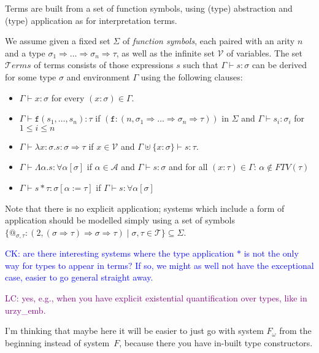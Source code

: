 \documentclass[runningheads,a4paper]{llncs}
\newcommand{\Typevars}{\mathcal{A}}
\newcommand{\Vars}{\mathcal{V}}
\newcommand{\Types}{\mathcal{T}}
\newcommand{\Terms}{\mathcal{T}\!\mathit{erms}}
\newcommand{\quant}[2]{\forall #1[#2]}
\newcommand{\arrtype}{\Rightarrow}
\newcommand{\abs}[2]{\lambda #1.#2}
\newcommand{\tabs}[2]{\Lambda #1.#2}
\newcommand{\tapp}[2]{#1 * #2}
\newcommand{\subst}[2]{#1:=#2}
\newcommand{\FTV}{\mathit{FTV}}
\newcommand{\CK}[1]{\textcolor{blue}{CK: #1}}
\newcommand{\LC}[1]{\textcolor{purple}{LC: #1}}
\begin{document}
Terms are built from a set of function symbols, using (type) abstraction
and (type) application as for interpretation terms.

\begin{definition}
We assume given a fixed set $\Sigma$ of \emph{function symbols}, each
paired with an arity $n$ and a type $\sigma_1 \arrtype \dots \arrtype
\sigma_n \arrtype \tau$, as well as the infinite set $\Vars$ of variables.
The set $\Terms$ of terms consists of those expressions $s$ such that
$\Gamma \vdash s : \sigma$ can be derived for some type $\sigma$ and
environment $\Gamma$ using the following clauses:
\begin{itemize}
\item $\Gamma \vdash x : \sigma$ for every $(x : \sigma) \in \Gamma$.
\item $\Gamma \vdash \mathtt{f}(s_1,\dots,s_n) : \tau$ if
  $(\mathtt{f} : (n,\sigma_1 \arrtype \dots \arrtype \sigma_n \arrtype
  \tau))$ in $\Sigma$ and $\Gamma \vdash s_i : \sigma_i$ for $1 \leq
  i \leq n$
\item $\Gamma \vdash \abs{x:\sigma}{s} : \sigma \arrtype \tau$ if $x
  \in \Vars$ and $\Gamma \uplus \{ x : \sigma \} \vdash s : \tau$.
\item $\Gamma \vdash \tabs{\alpha}{s} : \quant{\alpha}{\sigma}$ if
  $\alpha \in \Typevars$ and $\Gamma \vdash s : \sigma$ and for all
  $(x : \tau) \in \Gamma$: $\alpha \notin \FTV(\tau)$
\item $\Gamma \vdash \tapp{s}{\tau} : \sigma[\subst{\alpha}{\tau}]$ if
  $\Gamma \vdash s : \quant{\alpha}{\sigma}$
\end{itemize}
\end{definition}

Note that there is no explicit application; systems which include a form
of application should be modelled simply using a set of symbols $\{
@_{\sigma,\tau}: (2,(\sigma \arrtype \tau) \arrtype \sigma \arrtype \tau)
\mid \sigma,\tau \in \Types \} \subseteq \Sigma$.

\CK{are there interesting systems where the type application $*$ is
not the only way for types to appear in terms?  If so, we might as well
not have the exceptional case, easier to go general straight away.}

\LC{yes, e.g., when you have explicit existential quantification over
types, like in urzy\_emb.}

I'm thinking that maybe here it will be easier to just go with
system $F_\omega$ from the beginning instead of system~$F$, because
there you have in-built type constructors.
\end{document}
